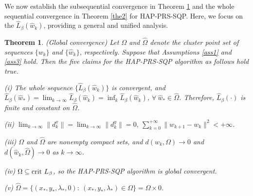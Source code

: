 \documentclass[pdflatex,sn-mathphys-num]{sn-jnl}%
\theoremstyle{thmstyleone}%
\newtheorem{theorem}{Theorem}%
\theoremstyle{thmstyletwo}%
\theoremstyle{thmstylethree}%
\begin{document}
We now establish the subsequential convergence in Theorem \ref{the1} and the whole sequential convergence in Theorem \ref{the2} for HAP-PRS-SQP. Here, we focus on the $\hat{L}_{\beta}(\hat{w}_k)$, providing a general and unified analysis. 
\begin{theorem}\label{the1}(Global convergence) Let $\Omega$ and $\hat{\Omega}$ denote the cluster point set of sequences $\{w_{k}\}$ and $\{\hat{w}_{k}\}$, respectively. Suppose that Assumptions \ref{ass1} and \ref{ass3} hold. Then the five claims for the HAP-PRS-SQP algorithm as follows hold true.

(i) The whole sequence $\{\hat{L}_{\beta}(\hat{w}_k)\}$ is convergent, and $\hat{L}_{\beta}(\hat{w}_*)=\lim_{k \to \infty }\hat{L}_{\beta}(\hat{w}_k)=\inf_{k}\hat{L}_{\beta}(\hat{w}_k)$, $\forall~\hat{w}_* \in \hat{\Omega}$. Therefore, $\hat{L}_{\beta}(\cdot)$ is finite and constant on $\hat{\Omega}$.

(ii) $ \lim_{k\to\infty}\|d_k^x\|=\lim_{k\to\infty}\|d_k^y\|=0,~\sum_{k=0}^{+\infty}\| w_{k+1}-w_k \|^2<+\infty$.

(iii) $\Omega$ and $\hat{\Omega}$ are nonempty compact sets, and  $d(w_k, \Omega) \to 0$ and $d(\hat{w}_k, \hat{\Omega}) \to 0$ as $k \to \infty$.

(iv) $\Omega \subseteq {\rm crit}~L_{\beta}$, so the HAP-PRS-SQP algorithm is global convergent.

(v) $\hat{\Omega} = \{(x_*,y_*,\lambda_*,0):~(x_*,y_*,\lambda_*) \in \Omega\}=\Omega\times {0}$.
\end{theorem}
\end{document}
